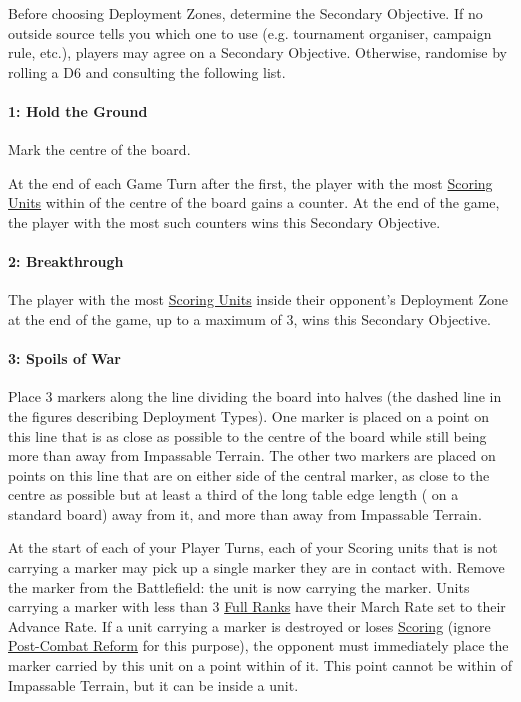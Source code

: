 Before choosing Deployment Zones, determine the Secondary Objective. If no outside source tells you which one to use (e.g. tournament organiser, campaign rule, etc.), players may agree on a Secondary Objective. Otherwise, randomise by rolling a D6 and consulting the following list.

\paragraph{1: Hold the Ground}

\newline
Mark the centre of the board.

At the end of each Game Turn after the first, the player with the most \hyperref[scoring]{Scoring Units} within  of the centre of the board gains a counter. At the end of the game, the player with the most such counters wins this Secondary Objective.

\paragraph{2: Breakthrough}

\newline
The player with the most \hyperref[scoring]{Scoring Units} inside their opponent's Deployment Zone at the end of the game, up to a maximum of 3, wins this Secondary Objective.

\paragraph{3: Spoils of War}

\newline
Place 3 markers along the line dividing the board into halves (the dashed line in the figures describing Deployment Types). One marker is placed on a point on this line that is as close as possible to the centre of the board while still being more than  away from Impassable Terrain. The other two markers are placed on points on this line that are on either side of the central marker, as close to the centre as possible but at least a third of the long table edge length ( on a standard board) away from it, and more than  away from Impassable Terrain.

At the start of each of your Player Turns, each of your Scoring units that is not carrying a marker may pick up a single marker they are in contact with. Remove the marker from the Battlefield: the unit is now carrying the marker. Units carrying a marker with less than 3 \hyperref[full_ranks]{Full Ranks} have their March Rate set to their Advance Rate. If a unit carrying a marker is destroyed or loses \hyperref[scoring]{Scoring} (ignore \hyperref[post_combat_reform]{Post-Combat Reform} for this purpose), the opponent must immediately place the marker carried by this unit on a point within  of it. This point cannot be within  of Impassable Terrain, but it can be inside a unit.

